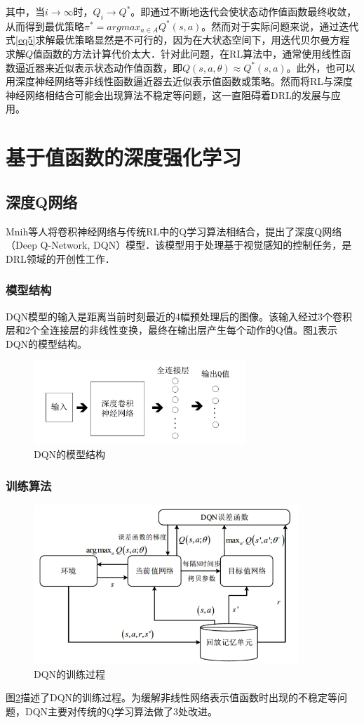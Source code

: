 \documentclass[bachelor]{thesis-uestc}
\begin{document}
	其中，当$i\rightarrow\infty$时，$Q_i\rightarrow Q^*$。即通过不断地迭代会使状态动作值函数最终收敛，从而得到最优策略$\pi^*=argmax_{a\in A}Q^*(s,a)$。然而对于实际问题来说，通过迭代式\ref{eq5}求解最优策略显然是不可行的，因为在大状态空间下，用迭代贝尔曼方程求解$Q$值函数的方法计算代价太大．针对此问题，在RL算法中，通常使用线性函数逼近器来近似表示状态动作值函数，即$Q(s,a,\theta)\approx Q^*(s,a)$。此外，也可以用深度神经网络等非线性函数逼近器去近似表示值函数或策略。然而将RL与深度神经网络相结合可能会出现算法不稳定等问题，这一直阻碍着DRL的发展与应用。
	
	\section{基于值函数的深度强化学习}
	\subsection{深度Q网络}
	Mnih等人将卷积神经网络与传统RL中的Q学习算法相结合，提出了深度Q网络（Deep Q-Network, DQN）模型．该模型用于处理基于视觉感知的控制任务，是DRL领域的开创性工作．
	
	\subsubsection{模型结构}
	DQN模型的输入是距离当前时刻最近的4幅预处理后的图像。该输入经过3个卷积层和2个全连接层的非线性变换，最终在输出层产生每个动作的Q值。图\ref{fg1}表示DQN的模型结构。
	\begin{figure}
		\includegraphics[width=8cm]{./pic/fg1.jpg}
		\caption{DQN的模型结构}
		\label{fg1}
	\end{figure}
	
	\subsubsection{训练算法}
	\begin{figure}
		\includegraphics[width=10cm]{./pic/fg2.jpg}
		\caption{DQN的训练过程}
		\label{fg2}
	\end{figure}
	图\ref{fg2}描述了DQN的训练过程。为缓解非线性网络表示值函数时出现的不稳定等问题，DQN主要对传统的Q学习算法做了3处改进。
	
\end{document}
